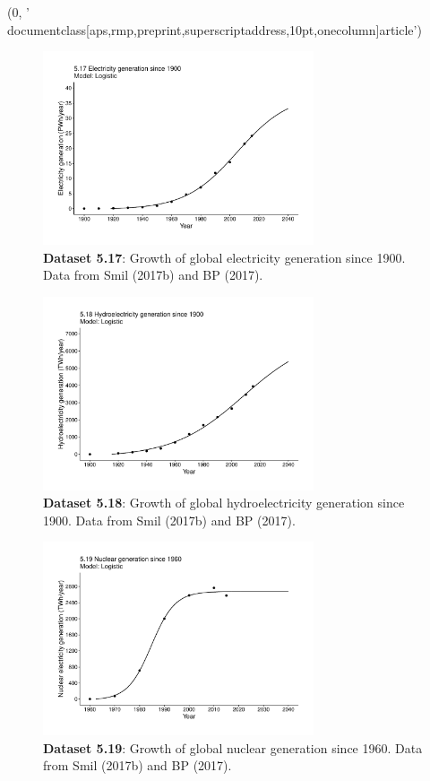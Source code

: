 (0, '\\documentclass[aps,rmp,preprint,superscriptaddress,10pt,onecolumn]{article}\n')
\begin{document}
\begin{figure}[h]
\includegraphics[width=8cm]{output/figs-ggplot/5.17.pdf}
\caption{\textbf{Dataset 5.17}: Growth of global electricity generation since 1900. Data from Smil (2017b) and BP (2017). }
\end{figure}
	
\begin{figure}[h]
\includegraphics[width=8cm]{output/figs-ggplot/5.18.pdf}
\caption{\textbf{Dataset 5.18}: Growth of global hydroelectricity generation since 1900. Data from Smil (2017b) and BP (2017).}
\end{figure}
	
\begin{figure}[h]
\includegraphics[width=8cm]{output/figs-ggplot/5.19.pdf}
\caption{\textbf{Dataset 5.19}: Growth of global nuclear generation since 1960. Data from Smil (2017b) and BP (2017).}
\end{figure}
	
\end{document}
